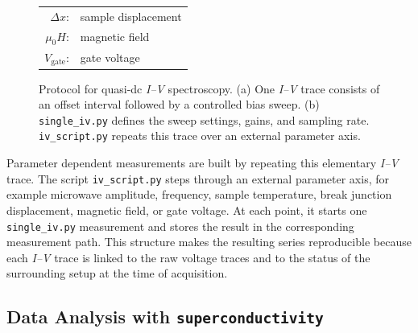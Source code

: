 \begin{figure}[t]
{\begin{minipage}[t][1.5in]{2.2in}
\begin{tabular}{rl}
                            $\Delta x$: & sample displacement \\
                            $\mu_0 H$: & magnetic field \\
                            $V_\mathrm{gate}$: & gate voltage  \\
                        \end{tabular}
                    \end{minipage}
                }%
                \caption{Protocol for quasi-dc \textit{I--V} spectroscopy. (a) One \textit{I--V} trace consists of an offset interval followed by a controlled bias sweep. (b) \texttt{single\_iv.py} defines the sweep settings, gains, and sampling rate. \texttt{iv\_script.py} repeats this trace over an external parameter axis.}
                \label{fig:methods:digital:ivscript}
            \end{figure}

            Parameter dependent measurements are built by repeating this elementary \textit{I--V} trace. The script \texttt{iv\_script.py} steps through an external parameter axis, for example microwave amplitude, frequency, sample temperature, break junction displacement, magnetic field, or gate voltage. At each point, it starts one \texttt{single\_iv.py} measurement and stores the result in the corresponding measurement path. This structure makes the resulting series reproducible because each \textit{I--V} trace is linked to the raw voltage traces and to the status of the surrounding setup at the time of acquisition.

    \newpage
    \subsection{Data Analysis with \texttt{superconductivity}}
    \label{subsec:methods:digital:analysis}


